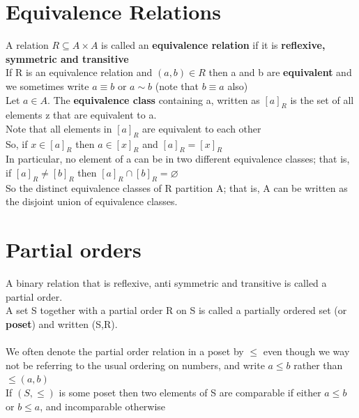 \documentclass{article}[18pt]
\begin{document}
\section{Equivalence Relations}
A relation $R\subseteq A\times A$ is called an \textbf{equivalence relation} if it is \textbf{reflexive, symmetric and transitive}\\
If R is an equivalence relation and $(a,b)\in R$ then a and b are \textbf{equivalent} and we sometimes write $a\equiv b$ or $a\sim b$ (note that $b\equiv a$ also)\\
Let $a\in A$. The \textbf{equivalence class} containing a, written as $[a]_R$ is the set of all elements z that are equivalent to a.\\
Note that all elements in $[a]_R$ are equivalent to each other\\
So, if $x\in [a]_R$ then $a\in [x]_R$ and $[a]_R=[x]_R$\\
In particular, no element of a can be in two different equivalence classes; that is, if $[a]_R\neq [b]_R$ then $[a]_R\cap [b]_R=\varnothing$\\
So the distinct equivalence classes of R partition A; that is, A can be written as the disjoint union of equivalence classes.
\section{Partial orders}
A binary relation that is reflexive, anti symmetric and transitive is called a partial order.\\
A set S together with a partial order R on S is called a partially ordered set (or \textbf{poset}) and written (S,R).\\
\\
We often denote the partial order relation in a poset by $\leqslant$ even though we way not be referring to the usual ordering on numbers, and write $a\leqslant b$ rather than $\leqslant (a,b)$\\
If $(S,\leqslant)$ is some poset then two elements of S are comparable if either $a\leqslant b$ or $b\leqslant a$, and incomparable otherwise
\end{document}
